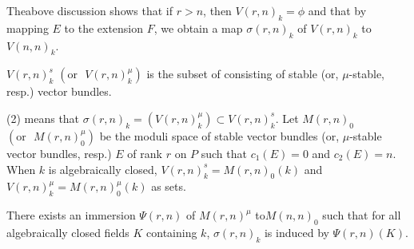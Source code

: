 The\pageoriginale above discussion shows that if $r>n$, then
$V(r,n)_k=\phi$ and that by mapping $E$ to the extension $F$, we
obtain a map $\sigma(r,n)_k$ of $V(r,n)_k$ to $V(n,n)_k$.

\begin{dfn}\label{dfn1.6}
$V(r,n)^{s}_k$ $\left(\text{or~ } V(r,n)^{\mu}_k\right)$ is the subset
  of consisting of stable (or, $\mu$-stable, resp.) vector bundles.
\end{dfn}

\begin{lem}
(2) means that $\sigma(r,n)_k=\left(V(r,n)^{\mu}_k\right)\subset
  V(r,n)^{s}_k$. Let $M(r,n)_0$ $\left(\text{or~ }
  M(r,n)^{\mu}_0\right)$ be the moduli space of stable vector bundles
  (or, $\mu$-stable vector bundles, resp.) $E$ of rank $r$ on $P$ such
  that $c_1(E)=0$ and $c_2(E)=n$. When $k$ is algebraically closed,
  $V(r,n)^{s}_k=M(r,n)_0(k)$ and $V(r,n)^{\mu}_k=M(r,n)^{\mu}_0(k)$ as
  sets. 
\end{lem}

\begin{Prop}\label{Prop1.7}
There exists an immersion $\Psi(r,n)$ of $M(r,n)^{\mu}$ to\break $M(n,n)_0$
such that for all algebraically closed fields $K$ containing $k$,
$\sigma(r,n)_k$ is induced by $\Psi(r,n)(K)$.
\end{Prop}

